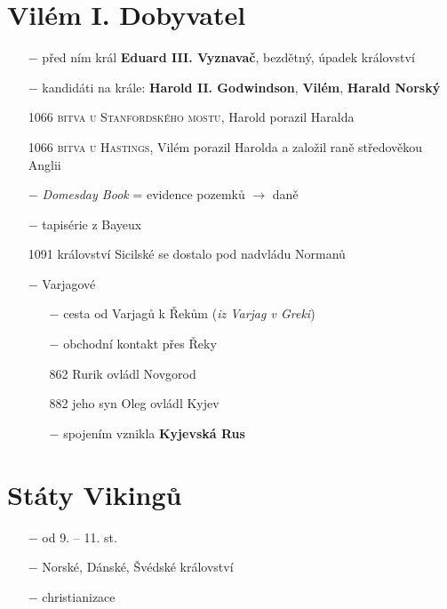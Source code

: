 \documentclass{article}
\begin{document}
\section*{Vilém I. Dobyvatel}
\begin{itemize}
    \vspace{-0.5em}
    \setlength\itemsep{0.15em}
    \item[$-$] před ním král \textbf{Eduard III. Vyznavač}, bezdětný, úpadek království
    \item[$-$] kandidáti na krále: \textbf{Harold II. Godwindson}, \textbf{Vilém}, \textbf{Harald Norský}
    \item[1066] \textsc{bitva u Stanfordského mostu}, Harold porazil Haralda
    \item[1066] \textsc{bitva u Hastings}, Vilém porazil Harolda a založil raně středověkou Anglii
    \item[$-$] \textit{Domesday Book} = evidence pozemků $\rightarrow$ daně
    \item[$-$] tapisérie z Bayeux
\end{itemize}
\hline
\begin{itemize}
    \vspace{-0.5em}
    \setlength\itemsep{0.15em}
    \item[1091] království Sicilské se dostalo pod nadvládu Normanů
    \item[$-$] Varjagové
    \begin{itemize}
        \vspace{-0.5em}
        \setlength\itemsep{0.15em}
        \item[$-$] cesta od Varjagů k Řekům (\textit{iz Varjag v Greki})
        \item[$-$] obchodní kontakt přes Řeky
        \item[862] Rurik ovládl Novgorod
        \item[882] jeho syn Oleg ovládl Kyjev
        \item[$-$] spojením vznikla \textbf{Kyjevská Rus}
    \end{itemize}
\end{itemize}

\section*{Státy Vikingů}
\begin{itemize}
    \vspace{-0.5em}
    \setlength\itemsep{0.15em}
    \item[$-$] od 9. -- 11. st.
    \item[$-$] Norské, Dánské, Švédské království
    \item[$-$] christianizace
\end{itemize}
\end{document}
